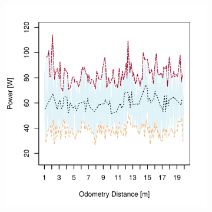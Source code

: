 \clearpage
\begin{figure}[h]
\captionsetup[subfigure]{justification=centering}
\vspace{-2ex}
	\centering
    \setlength{\subfigureWidth}{0.50\textwidth}
    \setlength{\graphicsHeight}{80mm}
    \hypersetup{hidelinks=true}%
    \begin{subfigure}[t]{\subfigureWidth}
        \centering
        \includegraphics[height=\graphicsHeight]{sections/design/power-budget/plots/locomotion-power-draw-on-flat-terrain-1.png}
        \label{fig:plot:sub:sherpatt-flat-terrain-power-draw-1}
    \end{subfigure}\hfill
    \begin{subfigure}[t]{\subfigureWidth}
        \centering

\end{subfigure}
\end{figure}
